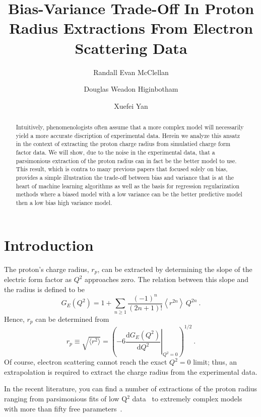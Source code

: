 \documentclass[10pt,aps,prc,twocolumn]{revtex4-1}
\begin{document}
\title{Bias-Variance Trade-Off In Proton Radius Extractions From Electron Scattering Data} 

\author{Randall Evan McClellan}
\author{Douglas Weadon Higinbotham}
\author{Xuefei Yan}

\begin{abstract}
Intuitively, phenomenologists often assume that a more complex model will necessarily yield a more 
accurate discription of experimental data.   Herein we analyze this ansatz in the context of extracting 
the proton charge radius from simulatied charge form factor data.
We will show, due to the noise in the experimental data,
that a parsimonious extraction of the proton radius can in fact be the better model to use.
This result, which is contra to many previous papers that focused solely on bias,  provides a 
simple illustration the trade-off between bias and variance that is at the
heart of machine learning algorithms as well as the basis for regression regularization methods
where a biased model with a low variance can be the better predictive model then a low bias high
variance model.  
\end{abstract}

\maketitle

\section{Introduction}

The proton's charge radius, $r_p$, can be extracted
by determining the slope of the electric form factor as $Q^2$
approaches zero.   The relation between this slope and 
the radius is defined to be
$$
G_E(Q^2)
   =  1
   +  \sum_{n\ge 1} \frac{(-1)^n}{(2n+1)!}
      \left\langle r^{2n} \right\rangle \, Q^{2n} \>.
$$
Hence, $r_p$ can be determined from
$$
  r_p \equiv \sqrt{ \langle r^2 \rangle}
   = \left( -6  \left. \frac{\mathrm{d} G_E(Q^2)}{\mathrm{d}Q^2}
    \right|_{Q^{2}=0} \right)^{1/2} \>.
 $$
Of course, electron scattering cannot reach the exact $Q^2 = 0$ limit; thus,
an extrapolation is required to extract the charge radius from the experimental data.

In the recent literature, you can find a number of extractions of the proton radius ranging from
parsimonious fits of low Q$^2$ data~\cite{Griffioen:2015hta,Horbatsch:2016ilr,Higinbotham:2015rja} to 
extremely complex models with more than fifty free parameters~\cite{}.
\end{document}
